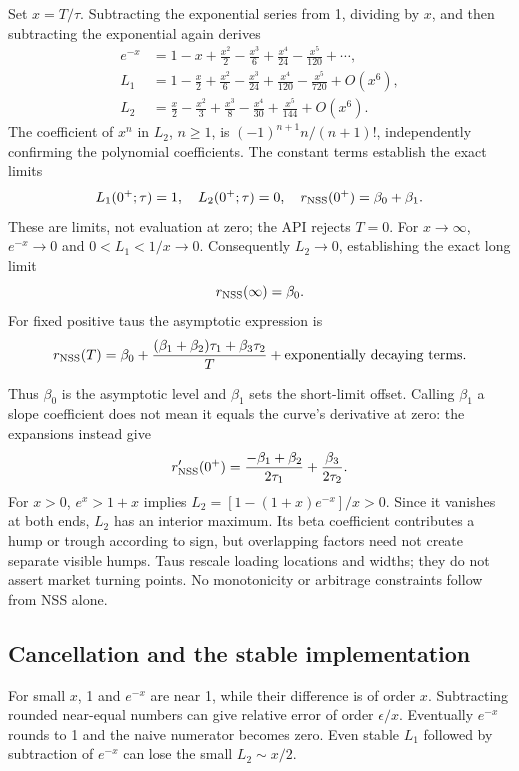 \documentclass[12pt,a4paper]{article}
\begin{document}
Set $x=T/\tau$. Subtracting the exponential series from 1, dividing by
$x$, and then subtracting the exponential again derives
\begin{align}
 e^{-x}&=1-x+\frac{x^2}{2}-\frac{x^3}{6}
               +\frac{x^4}{24}-\frac{x^5}{120}+\cdots,\\
 L_1&=1-\frac{x}{2}+\frac{x^2}{6}-\frac{x^3}{24}
              +\frac{x^4}{120}-\frac{x^5}{720}+O(x^6),\\
 L_2&=\frac{x}{2}-\frac{x^2}{3}+\frac{x^3}{8}
              -\frac{x^4}{30}+\frac{x^5}{144}+O(x^6).
\end{align}
The coefficient of $x^n$ in $L_2$, $n\geq1$, is
$(-1)^{n+1}n/(n+1)!$, independently confirming the polynomial coefficients.
The constant terms establish the exact limits
\begin{equation}
 L_1(0^+;\tau)=1,\quad L_2(0^+;\tau)=0,\quad
 r_{\rm NSS}(0^+)=\beta_0+\beta_1.
\end{equation}
These are limits, not evaluation at zero; the API rejects $T=0$.
For $x\to\infty$, $e^{-x}\to0$ and $0<L_1<1/x\to0$.
Consequently $L_2\to0$, establishing the exact long limit
\begin{equation}
 r_{\rm NSS}(\infty)=\beta_0.
\end{equation}
For fixed positive taus the asymptotic expression is
\begin{equation}
 r_{\rm NSS}(T)=\beta_0+
 \frac{(\beta_1+\beta_2)\tau_1+\beta_3\tau_2}{T}
 +\text{exponentially decaying terms}.
\end{equation}

Thus $\beta_0$ is the asymptotic level and $\beta_1$ sets the short-limit
offset. Calling $\beta_1$ a slope coefficient does not mean it equals
the curve's derivative at zero: the expansions instead give
\[
 r_{\rm NSS}'(0^+)
 =\frac{-\beta_1+\beta_2}{2\tau_1}+\frac{\beta_3}{2\tau_2}.
\]
For $x>0$, $e^x>1+x$ implies $L_2=[1-(1+x)e^{-x}]/x>0$.
Since it vanishes at both ends, $L_2$ has an interior maximum.
Its beta coefficient contributes a hump or trough according to sign,
but overlapping factors need not create separate visible humps.
Taus rescale loading locations and widths; they do not assert market
turning points. No monotonicity or arbitrage constraints follow from NSS alone.

\subsection{Cancellation and the stable implementation}
For small $x$, 1 and $e^{-x}$ are near 1, while their difference is of
order $x$. Subtracting rounded near-equal numbers can give relative error
of order $\epsilon/x$. Eventually $e^{-x}$ rounds to 1 and the naive
numerator becomes zero. Even stable $L_1$ followed by subtraction of
$e^{-x}$ can lose the small $L_2\sim x/2$.
\end{document}
